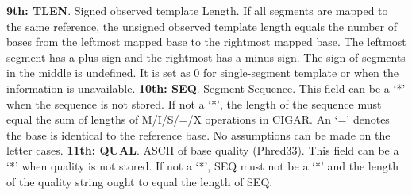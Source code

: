 \documentclass[11pt]{article}
\begin{document}
\begin{sloppypar}
\newline
\textbf{9th: TLEN}. 
Signed observed template Length. 
If all segments are mapped to the same reference, the unsigned observed template length equals the number of bases from the leftmost mapped base to the rightmost mapped base. 
The leftmost segment has a plus sign and the rightmost has a minus sign. 
The sign of segments in the middle is undefined. 
It is set as 0 for single-segment template or when the information is unavailable.
\newline
\textbf{10th: SEQ}. 
Segment Sequence. This field can be a ‘*’ when the sequence is not stored. 
If not a ‘*’, the length of the sequence must equal the sum of lengths of M/I/S/=/X operations in CIGAR. 
An ‘=’ denotes the base is identical to the reference base. 
No assumptions can be made on the letter cases.
\newline
\textbf{11th: QUAL}. 
ASCII of base quality (Phred33). 
This field can be a ‘*’ when quality is not stored. 
If not a ‘*’, SEQ must not be a ‘*’ and the length of the quality string ought to equal the length of SEQ.


\end{sloppypar}
\end{document}
